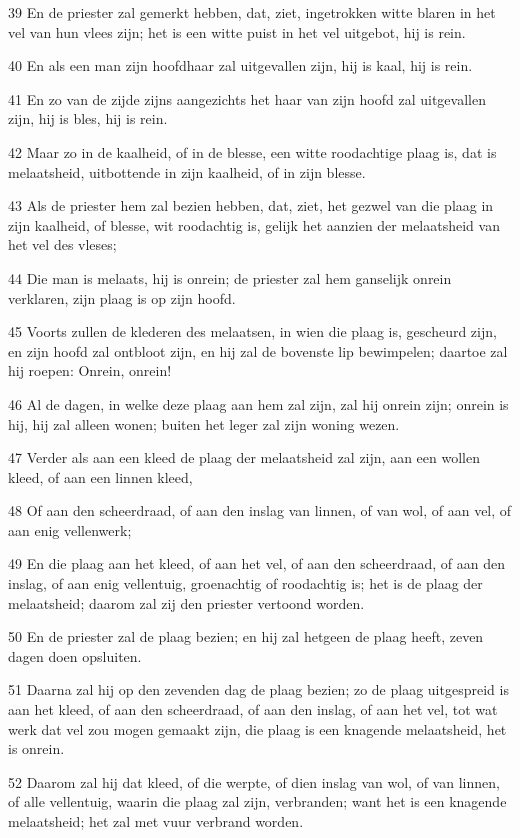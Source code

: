 \par 39 En de priester zal gemerkt hebben, dat, ziet, ingetrokken witte blaren in het vel van hun vlees zijn; het is een witte puist in het vel uitgebot, hij is rein.
\par 40 En als een man zijn hoofdhaar zal uitgevallen zijn, hij is kaal, hij is rein.
\par 41 En zo van de zijde zijns aangezichts het haar van zijn hoofd zal uitgevallen zijn, hij is bles, hij is rein.
\par 42 Maar zo in de kaalheid, of in de blesse, een witte roodachtige plaag is, dat is melaatsheid, uitbottende in zijn kaalheid, of in zijn blesse.
\par 43 Als de priester hem zal bezien hebben, dat, ziet, het gezwel van die plaag in zijn kaalheid, of blesse, wit roodachtig is, gelijk het aanzien der melaatsheid van het vel des vleses;
\par 44 Die man is melaats, hij is onrein; de priester zal hem ganselijk onrein verklaren, zijn plaag is op zijn hoofd.
\par 45 Voorts zullen de klederen des melaatsen, in wien die plaag is, gescheurd zijn, en zijn hoofd zal ontbloot zijn, en hij zal de bovenste lip bewimpelen; daartoe zal hij roepen: Onrein, onrein!
\par 46 Al de dagen, in welke deze plaag aan hem zal zijn, zal hij onrein zijn; onrein is hij, hij zal alleen wonen; buiten het leger zal zijn woning wezen.
\par 47 Verder als aan een kleed de plaag der melaatsheid zal zijn, aan een wollen kleed, of aan een linnen kleed,
\par 48 Of aan den scheerdraad, of aan den inslag van linnen, of van wol, of aan vel, of aan enig vellenwerk;
\par 49 En die plaag aan het kleed, of aan het vel, of aan den scheerdraad, of aan den inslag, of aan enig vellentuig, groenachtig of roodachtig is; het is de plaag der melaatsheid; daarom zal zij den priester vertoond worden.
\par 50 En de priester zal de plaag bezien; en hij zal hetgeen de plaag heeft, zeven dagen doen opsluiten.
\par 51 Daarna zal hij op den zevenden dag de plaag bezien; zo de plaag uitgespreid is aan het kleed, of aan den scheerdraad, of aan den inslag, of aan het vel, tot wat werk dat vel zou mogen gemaakt zijn, die plaag is een knagende melaatsheid, het is onrein.
\par 52 Daarom zal hij dat kleed, of die werpte, of dien inslag van wol, of van linnen, of alle vellentuig, waarin die plaag zal zijn, verbranden; want het is een knagende melaatsheid; het zal met vuur verbrand worden.
